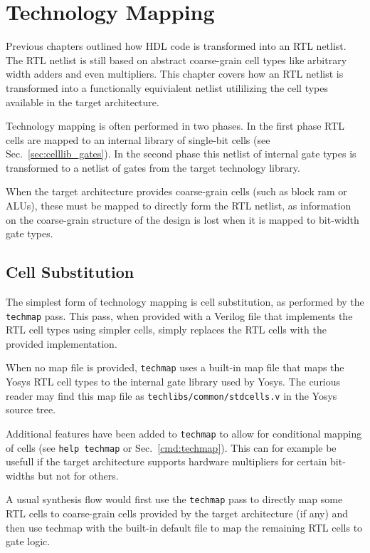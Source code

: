 
\chapter{Technology Mapping}
\label{chapter:techmap}

Previous chapters outlined how HDL code is transformed into an RTL netlist. The
RTL netlist is still based on abstract coarse-grain cell types like arbitrary
width adders and even multipliers. This chapter covers how an RTL netlist is
transformed into a functionally equivialent netlist utililizing the cell types
available in the target architecture.

Technology mapping is often performed in two phases. In the first phase RTL cells
are mapped to an internal library of single-bit cells (see Sec.~\ref{sec:celllib_gates}).
In the second phase this netlist of internal gate types is transformed to a netlist
of gates from the target technology library.

When the target architecture provides coarse-grain cells (such as block ram
or ALUs), these must be mapped to directly form the RTL netlist, as information
on the coarse-grain structure of the design is lost when it is mapped to
bit-width gate types.

\section{Cell Substitution}

The simplest form of technology mapping is cell substitution, as performed by
the {\tt techmap} pass. This pass, when provided with a Verilog file that
implements the RTL cell types using simpler cells, simply replaces the RTL
cells with the provided implementation.

When no map file is provided, {\tt techmap} uses a built-in map file that
maps the Yosys RTL cell types to the internal gate library used by Yosys.
The curious reader may find this map file as {\tt techlibs/common/stdcells.v} in
the Yosys source tree.

Additional features have been added to {\tt techmap} to allow for conditional
mapping of cells (see {\tt help techmap} or Sec.~\ref{cmd:techmap}). This can
for example be usefull if the target architecture supports hardware multipliers for
certain bit-widths but not for others.

A usual synthesis flow would first use the {\tt techmap} pass to directly map
some RTL cells to coarse-grain cells provided by the target architecture (if
any) and then use techmap with the built-in default file to map the remaining
RTL cells to gate logic.

